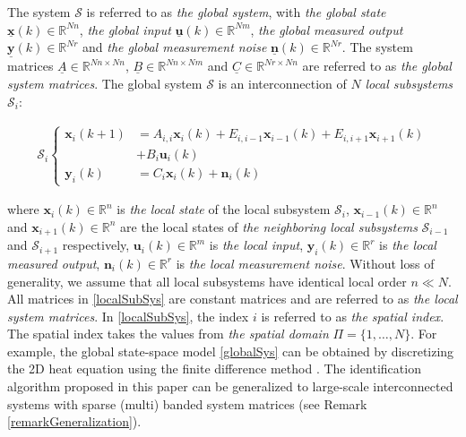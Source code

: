\documentclass[journal,10pt]{IEEEtran}
\begin{document}
The system $\mathcal{S}$ is referred to as \textit{the global system}, with \textit{the global state} $\underline{\mathbf{x}}(k)\in \mathbb{R}^{Nn}$, \textit{the global input} $\underline{\mathbf{u}}(k) \in \mathbb{R}^{Nm} $, \textit{the global measured output} $\underline{\mathbf{y}}(k)\in \mathbb{R}^{Nr}$ and \textit{the global measurement noise} $\underline{\mathbf{n}}(k)\in \mathbb{R}^{Nr}$. The system matrices $\underline{A}\in \mathbb{R}^{Nn\times Nn}$, $\underline{B}\in  \mathbb{R}^{Nn\times Nm} $ and $\underline{C}\in  \mathbb{R}^{Nr\times Nn}$ are referred to as \textit{the global system matrices}. The global system $\mathcal{S}$ is an interconnection of $N$ \textit{local subsystems} $\mathcal{S}_{i}$: 
\begin{small}
\begin{align}
\mathcal{S}_{i} \left\{ \begin{array} {rll}
\mathbf{x}_{i}(k+1)&=A_{i,i}\mathbf{x}_{i}(k)+E_{i,i-1}\mathbf{x}_{i-1}(k)+E_{i,i+1}\mathbf{x}_{i+1}(k) \\ &+B_{i}\mathbf{u}_{i}(k)  \\ 
\mathbf{y}_{i}(k)&=C_{i}\mathbf{x}_{i}(k)+ \mathbf{n}_{i}(k)   \end{array} \right.
\label{localSubSys}
\end{align}
\end{small}
where $\mathbf{x}_{i}(k)\in \mathbb{R}^{n}$ is \textit{the local state} of the local subsystem $\mathcal{S}_{i}$, $\mathbf{x}_{i-1}(k)\in \mathbb{R}^{n}$ and $\mathbf{x}_{i+1}(k)\in \mathbb{R}^{n}$ are the local states of \textit{the neighboring local subsystems} $\mathcal{S}_{i-1}$ and $\mathcal{S}_{i+1}$ respectively, $\mathbf{u}_{i}(k)\in \mathbb{R}^{m}$ is \textit{the local input}, $\mathbf{y}_{i}(k)\in \mathbb{R}^{r}$ is \textit{the local measured output}, $\mathbf{n}_{i}(k)\in \mathbb{R}^{r}$ is \textit{the local measurement noise}. Without loss of generality, we assume that all local subsystems have identical local order $n\ll N$. All matrices in \eqref{localSubSys} are constant matrices and are referred to as \textit{the local system matrices}. In \eqref{localSubSys}, the index $i$ is referred to as \textit{the spatial index}. The spatial index takes the values from \textit{the spatial domain}  $\Pi=\{1,\ldots, N\}$. For example, the global state-space model \eqref{globalSys} can be obtained by discretizing the 2D heat equation using the finite difference method \cite{benner2004,haberThesis}. The identification algorithm proposed in this paper can be generalized to large-scale interconnected systems with sparse (multi) banded system matrices (see Remark \ref{remarkGeneralization}).
\end{document}
